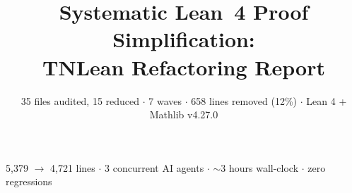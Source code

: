 \documentclass[aspectratio=169,10pt]{beamer}
\title{\textbf{Systematic Lean~4 Proof Simplification:\\TNLean Refactoring Report}}
\subtitle{{\small 35 files audited, 15 reduced $\cdot$ 7 waves $\cdot$ 658 lines removed (12\%) $\cdot$ Lean 4 + Mathlib v4.27.0}}
\date{}
\author{}
\begin{document}
{%
\begin{frame}
    \vspace{-1.5em}
    \maketitle
    \vspace{-3em}
    \begin{center}
        {\footnotesize
            \textcolor{dimwhite}{5{,}379 $\to$ 4{,}721 lines $\cdot$
            3 concurrent AI agents $\cdot$
            ${\sim}$3 hours wall-clock $\cdot$
            zero regressions}}
    \end{center}
\end{frame}
}

\end{document}
